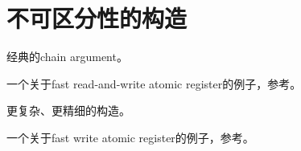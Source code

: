 \chapter{不可区分性的构造}

经典的chain argument。

\myleaf 一个关于fast read-and-write atomic register的例子，参考\cite{Dutta10}。

更复杂、更精细的构造。

\myleaf 一个关于fast write atomic register的例子，参考\cite{Huang20}。